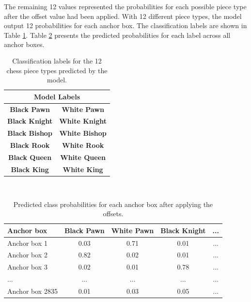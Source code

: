 The remaining 12 values represented the probabilities for each possible piece type after the offset value had been applied. With 12 different piece types, the model output 12 probabilities for each anchor box. The classification labels are shown in Table \ref{tab:piece-label-table}. Table \ref{tab:piece-probability-table} presents the predicted probabilities for each label across all anchor boxes. \\
\begin{table}[ht]
\renewcommand{\arraystretch}{1.1}  %
\centering
\caption{Classification labels for the 12 chess piece types predicted by the model.}
\begin{tabular}{|c|c|}
\hline
\multicolumn{2}{|c|}{\textbf{Model Labels}} \\  
\hline
\textbf{Black Pawn} & \textbf{White Pawn} \\
\textbf{Black Knight} & \textbf{White Knight} \\
\textbf{Black Bishop} & \textbf{White Bishop} \\
\textbf{Black Rook} & \textbf{White Rook} \\
\textbf{Black Queen} & \textbf{White Queen} \\
\textbf{Black King} & \textbf{White King} \\
\hline
\end{tabular}
\label{tab:piece-label-table}
\end{table}


\\


\begin{table}[h]
    \centering
    \caption{Predicted class probabilities for each anchor box after applying the offsets.}  %
    \renewcommand{\arraystretch}{1.5} %
    \begin{tabular}{lcccc}
        \toprule
        \textbf{Anchor box} & \textbf{Black Pawn} & \textbf{White Pawn} & \textbf{Black Knight} & \textbf{...} \\
        \midrule
        Anchor box 1 & \raggedright 0.03 & \raggedright 0.71 & \raggedright 0.01 & ... \\
        Anchor box 2 & \raggedright 0.82 & \raggedright 0.02 & \raggedright 0.01 & ... \\
        Anchor box 3 & \raggedright 0.02 & \raggedright 0.01 & \raggedright 0.78 & ... \\
        ... & ... & ... & ... & ... \\
        Anchor box 2835 & \raggedright 0.01 & \raggedright 0.03 & \raggedright 0.05 & ... \\
        \bottomrule
    \end{tabular}
    \label{tab:piece-probability-table}
\end{table}

